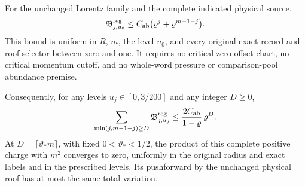 \begin{theorem}
\label{thm:ab-all-offset}
For the unchanged Lorentz family and the complete indicated physical
source,
\begin{equation}\label{eq:ab-all-offset}
 \mathfrak B^{\rm reg}_{j,u_0}
       \le C_{\rm ab}
                  \bigl(\varrho^j+\varrho^{m-1-j}\bigr).
\end{equation}
This bound is uniform in $R$, $m$, the level $u_0$, and every original
exact record and roof selector between zero and one.  It requires no
critical zero-offset chart, no critical momentum cutoff, and no
whole-word pressure or comparison-pool abundance premise.

Consequently, for any levels $u_j\in[0,3/200]$ and any integer
$D\ge0$,
\begin{equation}\label{eq:ab-full-depth}
 \sum_{\min(j,m-1-j)\ge D}\mathfrak B^{\rm reg}_{j,u_j}
          \le\frac{2C_{\rm ab}}{1-\varrho}\,\varrho^D.
\end{equation}
At $D=\lceil\vartheta_*m\rceil$, with fixed
$0<\vartheta_*<1/2$, the product of this complete positive charge
with $m^2$ converges to zero, uniformly in the original radius and
exact labels and in the prescribed levels.  Its pushforward by the
unchanged physical roof has at most the same total variation.
\end{theorem}
